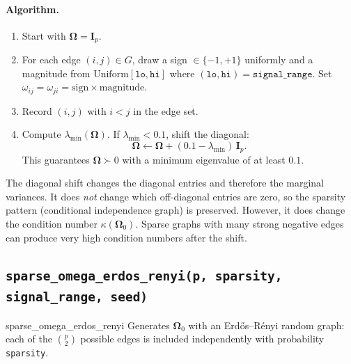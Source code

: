 \documentclass[11pt,a4paper]{article}
\newcommand{\bOmega}{\bm{\Omega}}
\begin{document}
\paragraph{Algorithm.}
\begin{enumerate}[nosep]
  \item Start with $\bOmega = \bm{I}_p$.
  \item For each edge $(i,j) \in G$, draw a sign $\in \{-1,+1\}$ uniformly and a magnitude from $\mathrm{Uniform}[\texttt{lo}, \texttt{hi}]$ where $(\texttt{lo}, \texttt{hi}) = \texttt{signal\_range}$.  Set $\omega_{ij} = \omega_{ji} = \text{sign} \times \text{magnitude}$.
  \item Record $(i,j)$ with $i < j$ in the edge set.
  \item Compute $\lambda_{\min}(\bOmega)$. If $\lambda_{\min} < 0.1$, shift the diagonal:
  \[
    \bOmega \leftarrow \bOmega + (0.1 - \lambda_{\min})\,\bm{I}_p.
  \]
  This guarantees $\bOmega \succ 0$ with a minimum eigenvalue of at least $0.1$.
\end{enumerate}

\begin{warningbox}
The diagonal shift changes the diagonal entries and therefore the marginal variances. It does \emph{not} change which off-diagonal entries are zero, so the sparsity pattern (conditional independence graph) is preserved. However, it does change the condition number $\kappa(\bOmega_0)$. Sparse graphs with many strong negative edges can produce very high condition numbers after the shift.
\end{warningbox}

\subsection{\texttt{sparse\_omega\_erdos\_renyi(p, sparsity, signal\_range, seed)}}

\begin{funccard}{sparse\_omega\_erdos\_renyi}
Generates $\bOmega_0$ with an Erd\H{o}s--R\'enyi random graph: each of the $\binom{p}{2}$ possible edges is included independently with probability \texttt{sparsity}.
\end{funccard}
\end{document}
